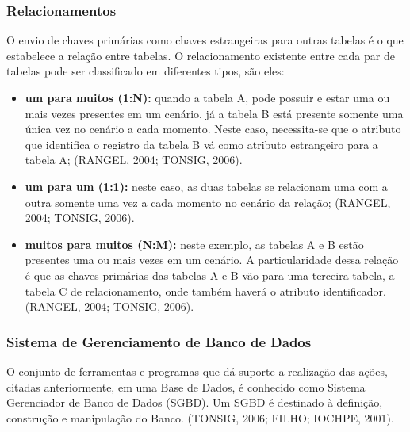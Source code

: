 \documentclass[a4paper,12pt]{article}
\begin{document}
\subsubsection{Relacionamentos}
O envio de chaves primárias como chaves estrangeiras para outras tabelas é o que estabelece a relação entre tabelas. O relacionamento existente entre cada par de tabelas pode ser classificado em diferentes tipos, são eles:
\begin{itemize}
	\item\textbf{um para muitos (1:N):} quando a tabela A, pode possuir e estar uma ou mais vezes presentes em um cenário, já a tabela B está presente somente uma única vez no cenário a cada momento. Neste caso, necessita-se que o atributo que identifica o registro da tabela B vá como atributo estrangeiro para a tabela A; (RANGEL, 2004; TONSIG, 2006).
	\item\textbf{um para um (1:1):} neste caso, as duas tabelas se relacionam uma com a outra somente uma vez a cada momento no cenário da relação; (RANGEL, 2004; TONSIG, 2006).
	\item\textbf{muitos para muitos (N:M):} neste exemplo, as tabelas A e B estão presentes uma ou mais vezes em um cenário. A particularidade dessa relação é que as chaves primárias das tabelas A e B vão para uma terceira tabela, a tabela C de relacionamento, onde também haverá o atributo identificador. (RANGEL, 2004; TONSIG, 2006).
\end{itemize}

\subsubsection{Sistema de Gerenciamento de Banco de Dados}
O conjunto de ferramentas e programas que dá suporte a realização das ações, citadas anteriormente, em uma Base de Dados, é conhecido como Sistema Gerenciador de Banco de Dados (SGBD). Um SGBD é destinado à definição, construção e manipulação do Banco. (TONSIG, 2006; FILHO; IOCHPE, 2001). 
\end{document}

